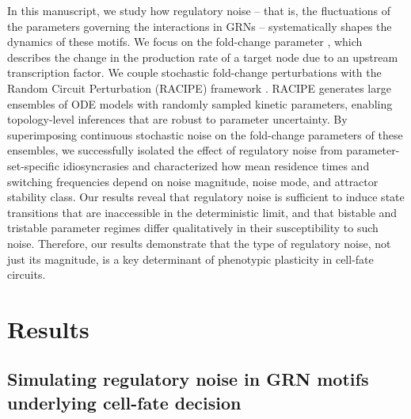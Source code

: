 \documentclass[11pt]{article}
\begin{document}
In this manuscript, we study how regulatory noise – that is, the fluctuations of the parameters governing the interactions in GRNs – systematically shapes the dynamics of these motifs. We focus on the fold-change parameter \cite{Huang2017}, which describes the change in the production rate of a target node due to an upstream transcription factor. We couple stochastic fold-change perturbations with the Random Circuit Perturbation (RACIPE) framework \cite{Huang2017}. RACIPE generates large ensembles of ODE models with randomly sampled kinetic parameters, enabling topology-level inferences that are robust to parameter uncertainty. By superimposing continuous stochastic noise on the fold-change parameters of these ensembles, we successfully isolated the effect of regulatory noise from parameter-set-specific idiosyncrasies and characterized how mean residence times and switching frequencies depend on noise magnitude, noise mode, and attractor stability class. Our results reveal that regulatory noise is sufficient to induce state transitions that are inaccessible in the deterministic limit, and that bistable and tristable parameter regimes differ qualitatively in their susceptibility to such noise. Therefore, our results demonstrate that the type of regulatory noise, not just its magnitude, is a key determinant of phenotypic plasticity in cell-fate circuits.

\section{Results}

\subsection{Simulating regulatory noise in GRN motifs underlying cell-fate decision}
\end{document}
